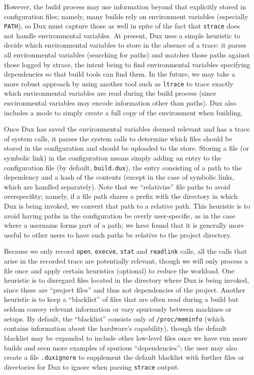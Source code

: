 \documentclass[10pt,conference]{IEEEtran}
\begin{document}
However, the build process may use information beyond that explicitly stored in configuration files; namely,
many builds rely on environment variables (especially \texttt{PATH}), so Dux must capture those as well
in spite of the fact that \texttt{strace} does not handle environmental variables. At present, Dux uses a
simple heuristic to decide which environmental variables to store in the absence of a trace: it parses
all environmental variables (searching for paths) and matches those paths against those logged by strace,
the intent being to find environmental variables specifying dependencies so that build tools can find them.
In the future, we may take a more robust approach by using another tool such as \texttt{ltrace} to trace
exactly which environmental variables are read during the build process (since environmental variables may
encode information other than paths). Dux also includes a mode to simply create a full copy of the environment
when building.

Once Dux has saved the environmental variables deemed relevant and has a trace of system calls, it parses
the system calls to determine which files should be stored in the configuration and should be uploaded to
the store. Storing a file (or symbolic link) in the configuration means simply adding an entry to the
configuration file (by default, \texttt{build.dux}), the entry consisting of a path to the dependency
and a hash of the contents
(except in the case of symbolic links, which are handled separately).
 Note that we ``relativize'' file paths to avoid overspecifity; namely,
if a file path shares a prefix with the directory in which Dux is being invoked, we convert that path to
a relative path. This heuristic is to avoid having paths in the configuration be overly user-specific, as in the
case where a username forms part of a path; we have found that it is generally more useful to other users to have such paths be
relative to the project directory.

Because we only record \texttt{open}, \texttt{execve}, \texttt{stat} and \texttt{readlink} calls, all the
calls that arise in the recorded trace are potentially relevant, though we will only process a file once
and apply certain heuristics (optional) to reduce the workload. One heuristic is to disregard files located 
in the directory where Dux is being invoked, since these are ``project files'' and thus not dependencies
of the project. Another heuristic is to keep a ``blacklist'' of files that are often read during a build
but seldom convey relevant information or vary spuriously between machines or setups. By default, the
``blacklist'' consists only of \texttt{/proc/meminfo} (which contains information about the hardware's
capability), though the default blacklist may be expanded to include other low-level files once we have
run more builds and seen more examples of spurious ``dependencies''; the user may also create
a file \texttt{.duxignore} to supplement the default blacklist with further files or directories for
Dux to ignore when parsing \texttt{strace} output.
\end{document}
